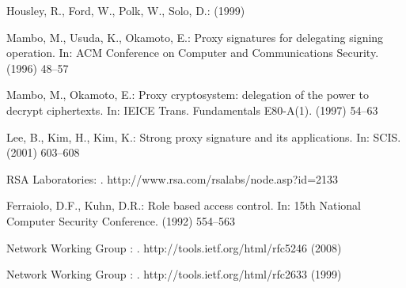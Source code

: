 \documentclass[runningheads]{llncs}
\begin{document}
\begin{thebibliography}{1}

Housley, R., Ford, W., Polk, W., Solo, D.:
 (1999)

Mambo, M., Usuda, K., Okamoto, E.:
\newblock Proxy signatures for delegating signing operation.
\newblock In: ACM Conference on Computer and Communications Security. (1996)
  48--57

Mambo, M., Okamoto, E.:
\newblock Proxy cryptosystem: delegation of the power to decrypt ciphertexts.
\newblock In: IEICE Trans. Fundamentals E80-A(1). (1997)  54--63

Lee, B., Kim, H., Kim, K.:
\newblock Strong proxy signature and its applications.
\newblock In: SCIS. (2001)  603--608

{RSA Laboratories}:
.
\newblock http://www.rsa.com/rsalabs/node.asp?id=2133

Ferraiolo, D.F., Kuhn, D.R.:
\newblock Role based access control.
\newblock In: 15th National Computer Security Conference. (1992)  554--563

{Network Working Group }:
.
\newblock http://tools.ietf.org/html/rfc5246 (2008)

{Network Working Group }:
.
\newblock http://tools.ietf.org/html/rfc2633 (1999)

\end{thebibliography}
\end{document}

